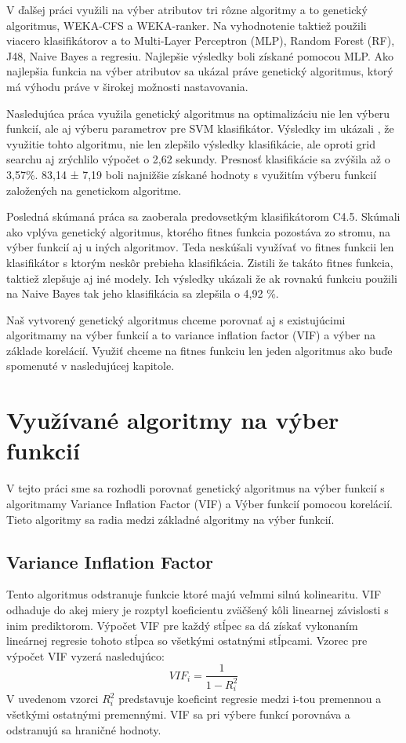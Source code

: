 \documentclass[runningheads]{llncs}
\begin{document}
V ďalšej práci\cite{ref_babatunde} využili na výber atributov tri rôzne algoritmy a to 
genetický algoritmus, WEKA-CFS a WEKA-ranker. Na vyhodnotenie taktiež použili viacero klasifikátorov
a to Multi-Layer Perceptron (MLP), Random Forest (RF), J48, Naive Bayes a regresiu. Najlepšie výsledky 
boli získané pomocou MLP. Ako najlepšia funkcia na výber atributov sa ukázal práve genetický algoritmus,
ktorý má výhodu práve v širokej možnosti nastavovania.

Nasledujúca práca\cite{ref_zhao} využila genetický algoritmus na optimalizáciu nie 
len výberu funkcií, ale aj výberu parametrov pre SVM klasifikátor. Výsledky im ukázali
, že využitie tohto algoritmu, nie len zlepšilo výsledky klasifikácie, 
ale oproti  grid searchu aj zrýchlilo výpočet o 2,62 sekundy.
Presnosť klasifikácie sa zvýšila až o 3,57\%. 83,14 ± 7,19 boli najnižšie 
získané hodnoty s využitím výberu funkcií založených na genetickom algoritme.

Posledná skúmaná práca \cite{ref_smith} sa zaoberala predovsetkým klasifikátorom C4.5.
Skúmali ako vplýva genetický algoritmus, ktorého fitnes funkcia pozostáva zo stromu, 
na výber funkcií aj u iných algoritmov. Teda neskúšali využívať vo fitnes funkcii len
klasifikátor s ktorým neskôr prebieha klasifikácia. Zistili že takáto fitnes funkcia,
taktiež zlepšuje aj iné modely. Ich výsledky ukázali že ak rovnakú funkciu použili na 
Naive Bayes tak jeho klasifikácia sa zlepšila o 4,92 \%.

Naš vytvorený genetický algoritmus chceme porovnať aj s existujúcimi algoritmamy na výber 
funkcií a to variance inflation factor (VIF) a výber na základe korelácií. Využiť chceme
na fitnes funkciu len jeden algoritmus ako buďe spomenuté v nasledujúcej kapitole.


\section{Využívané algoritmy na výber funkcií}
V tejto práci sme sa rozhodli porovnať genetický algoritmus na výber funkcií s
algoritmamy Variance Inflation Factor (VIF) a Výber funkcií pomocou korelácií. Tieto 
algoritmy sa radia medzi základné algoritmy na výber funkcií. \cite{ref_xu}
\subsection{Variance Inflation Factor}
Tento algoritmus odstranuje funkcie ktoré majú veľmmi silnú kolinearitu.
VIF odhaduje do akej miery je rozptyl koeficientu zväčšený kôli linearnej závislosti
s inim prediktorom. Výpočet VIF pre každý stĺpec sa dá získať vykonaním lineárnej 
regresie tohoto stĺpca so všetkými ostatnými stĺpcami.\cite{ref_xu}
Vzorec pre výpočet VIF vyzerá nasledujúco:
\begin{equation}
VIF_{i}=\frac{1}{1-R_{i}^{2}}
\end{equation}    
V uvedenom vzorci \begin{math}R_i^2\end{math} predstavuje koeficint regresie medzi i-tou premennou a 
všetkými ostatnými premennými. VIF sa pri výbere funkcí porovnáva a odstranujú sa hraničné hodnoty.\cite{ref_xu}
\end{document}
